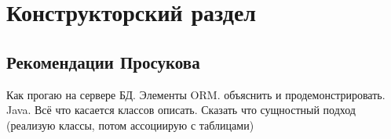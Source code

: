 \chapter{Конструкторский раздел}
\section{Рекомендации Просукова}
Как прогаю на сервере БД. Элементы ORM. объяснить и продемонстрировать. Java. Всё что касается классов описать. Сказать что сущностный подход (реализую классы, потом ассоциирую с таблицами)
